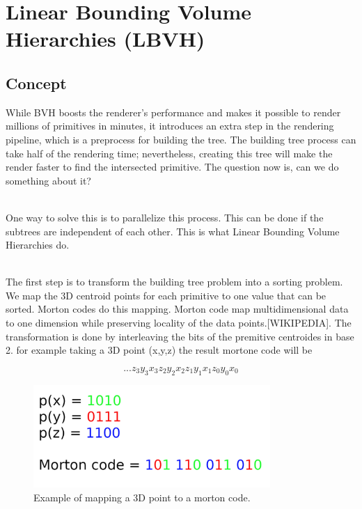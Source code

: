 \documentclass[11pt,a4paper]{article}
\begin{document}
\clearpage

\section{Linear Bounding Volume Hierarchies (LBVH)}
\subsection{Concept}
While BVH boosts the renderer's performance and makes it possible to render millions of primitives in minutes, it introduces an extra step in the rendering pipeline, which is a preprocess for building the tree. The building tree process can take half of the rendering time; nevertheless, creating this tree will make the render faster to find the intersected primitive. The question now is, can we do something about it? 

\noindent
\\
One way to solve this is to parallelize this process. This can be done if the subtrees are independent of each other. This is what Linear Bounding Volume Hierarchies do.

\noindent
\\
The first step is to transform the building tree problem into a sorting problem. We map the 3D centroid points for each primitive to one value that can be sorted. Morton codes do this mapping. Morton code map multidimensional data to one dimension while preserving locality of the data points.[WIKIPEDIA]. The transformation is done by interleaving the bits of the premitive centroides in base 2. for example taking a 3D point (x,y,z) the result mortone code will be 

\begin{equation}
 ...z_3y_3x_3z_2y_2x_2z_1y_1x_1z_0y_0x_0
\end{equation}


\begin{figure}[h]	
     \centering
     \captionsetup{justification=centering,margin=2cm}
     \includegraphics[width=9cm]{images/z_curve.png}
     \caption{Example of mapping a 3D point to a morton code.}
     \label{fig:dice}
\end{figure}
\end{document}
